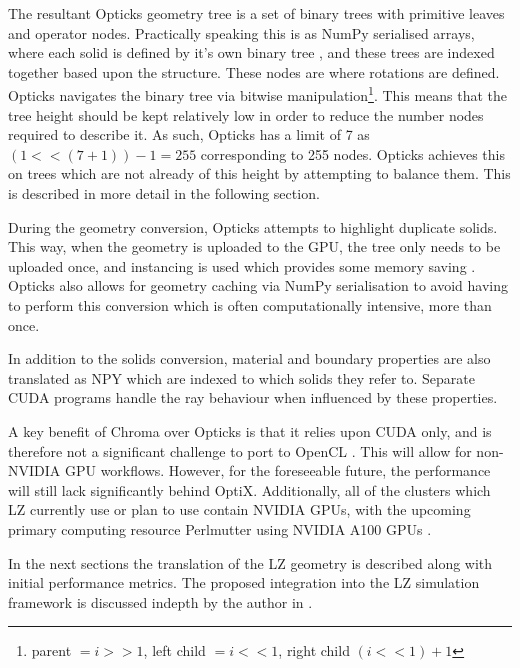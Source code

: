 The resultant Opticks geometry tree is a set of binary trees with primitive leaves and operator nodes.
Practically speaking this is as NumPy serialised arrays, where each solid is defined by it's own binary tree \cite{Opticks_Paper_2017_ref}, and these trees are indexed together based upon the structure.
These nodes are where rotations are defined.
Opticks navigates the binary tree via bitwise manipulation\footnote{parent $=i >> 1$, left child $= i << 1$, right child $(i<<1)+1$}.
This means that the tree height should be kept relatively low in order to reduce the number nodes required to describe it.
As such, Opticks has a limit of 7 as $(1 << (7 + 1)) - 1 = 255$ corresponding to 255 nodes.
Opticks achieves this on trees which are not already of this height by attempting to balance them.
This is described in more detail in the following section.
\par
During the geometry conversion, Opticks attempts to highlight duplicate solids.
This way, when the geometry is uploaded to the GPU, the tree only needs to be uploaded once, and instancing is used which provides some memory saving \cite{Opticks_CHEP_2019_ref}.
Opticks also allows for geometry caching via NumPy serialisation \cite{Opticks_Paper_2017_ref} to avoid having to perform this conversion which is often computationally intensive, more than once.
\par
In addition to the solids conversion, material and boundary properties are also translated as NPY which are indexed to which solids they refer to.
Separate CUDA programs handle the ray behaviour when influenced by these properties.
\par
A key benefit of Chroma over Opticks is that it relies upon CUDA only, and is therefore not a significant challenge to port to OpenCL \cite{chroma_whitepaper_ref}.
This will allow for non-NVIDIA GPU workflows.
However, for the foreseeable future, the performance will still lack significantly behind OptiX.
Additionally, all of the clusters which LZ currently use or plan to use contain NVIDIA GPUs, with the upcoming primary computing resource Perlmutter using NVIDIA A100 GPUs \cite{perlmutter_ref}.
\par
In the next sections the translation of the LZ geometry is described along with initial performance metrics.
The proposed integration into the LZ simulation framework is discussed indepth by the author in \cite{SEriksen_Opticks_CHEP_2021_ref}.


